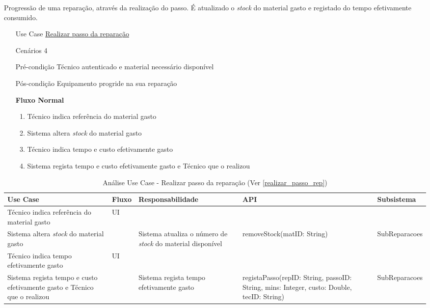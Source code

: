 \documentclass[../relatorio.tex]{subfiles}
\begin{document}
Progressão de uma reparação, através da realização do passo.
É atualizado o \textit{stock} do material gasto e registado do tempo efetivamente consumido.
\begin{itemize}
    \item[Use Case] {\underline{Realizar passo da reparação}}
    \item[Cenários] {4}
    \item[Pré-condição] {Técnico autenticado e material necessário disponível}
    \item[Pós-condição] {Equipamento progride na sua reparação}
          \begin{flushleft}
              \textbf{Fluxo Normal}
          \end{flushleft}
          \begin{enumerate}
              \item Técnico indica referência do material gasto
              \item Sistema altera \textit{stock} do material gasto
              \item Técnico indica tempo e custo efetivamente gasto 
              \item Sistema regista tempo e custo efetivamente gasto e Técnico que o realizou
          \end{enumerate}
\end{itemize}

\begin{landscape}
    \begin{table}[!h]
        \centering
        \begin{tabular}{|p{5cm}|p{1cm}|p{4cm}|p{6cm}|p{3cm}|}
            \hline
            \rowcolor{gray!20!white}
            Use Case & Fluxo & Responsabilidade & API & Subsistema \\
            \hline
            \rowcolor{yellow}
            Técnico indica referência do material gasto
                     & UI
                     &
                     &
                     &
            \\
            \hline
            Sistema altera \textit{stock} do material gasto
                     & 
                     & Sistema atualiza o número de \textit{stock} do material disponível
                     & removeStock(matID: String)
                     & SubReparacoes
            \\
            \hline
            \rowcolor{yellow}
            Técnico indica tempo efetivamente gasto
                     & UI
                     &
                     &
                     &
            \\
            \hline
            Sistema regista tempo e custo efetivamente gasto e Técnico que o realizou
                     &
                     & Sistema regista tempo efetivamente gasto
                     & registaPasso(repID: String, passoID: String, mins: Integer, custo: Double, tecID: String)
                     & SubReparacoes
            \\
            \hline
        \end{tabular}
        \caption{Análise Use Case - Realizar passo da reparação (Ver \ref{realizar_passo_rep})}
    \end{table}
\end{landscape}
\end{document}
